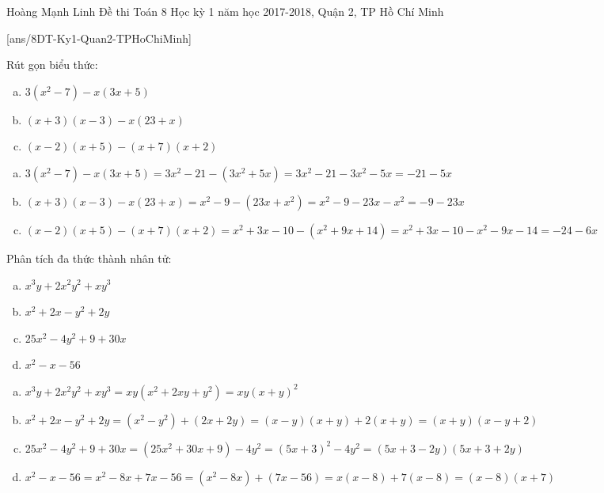 \begin{name}
{Hoàng Mạnh Linh}
{Đề thi Toán 8 Học kỳ 1 năm học 2017-2018, Quận 2, TP Hồ Chí Minh }
\end{name}
\setcounter{ex}{0}
[ans/8DT-Ky1-Quan2-TPHoChiMinh]
\begin{ex}%
Rút gọn biểu thức:
\begin{multicols}{2}
	\begin{enumerate}[a)]
	\item $3(x^2-7)-x(3x+5)$
	\item $(x+3)(x-3)-x(23+x)$
	\item $(x-2)(x+5)-(x+7)(x+2)$
	\end{enumerate}
\end{multicols}
\loigiai
	{
	\begin{enumerate}[a)]
	\item $3(x^2-7)-x(3x+5) = 3x^2 - 21 - (3x^2+5x) = 3x^2 - 21 - 3x^2 - 5x = -21 - 5x$
	\item $(x + 3)(x - 3) - x(23 + x) = x^2 - 9 - (23x + x^2) = x^2 - 9 - 23x - x^2 = -9 - 23x $
	\item $(x - 2)(x + 5) - (x + 7)(x+2) = x^2 + 3x - 10 - (x^2 + 9x + 14) =  x^2 + 3x - 10 - x^2 - 9x - 14 = -24 - 6x$
	\end{enumerate}
	}
\end{ex}

\begin{ex}%
Phân tích đa thức thành nhân tử:
\begin{multicols}{2}
\begin{enumerate}[a)]
\item $x^3y + 2x^2y^2 + xy^3$
\item $x^2 + 2x - y^2 + 2y$
\item $25x^2 - 4y^2 + 9 +30x$
\item $x^2 - x - 56$
\end{enumerate}
\end{multicols}
\loigiai
	{
	\begin{enumerate}[a)]
	\item $x^3y + 2x^2y^2 + xy^3 = xy(x^2 + 2xy + y^2) = xy(x + y)^2$
	\item $x^2 + 2x - y^2 + 2y = (x^2 - y^2) + (2x + 2y) = (x - y)(x + y) + 2(x + y) = (x + y)(x - y + 2)$
	\item $25x^2 - 4y^2 + 9 +30x = (25x^2 + 30x + 9) - 4y^2 = (5x + 3)^2 - 4y^2 = (5x + 3 - 2y)(5x + 3 + 2y)$
	\item $x^2 - x - 56 = x^2 - 8x + 7x - 56 = (x^2 - 8x) + (7x - 56) = x(x - 8) + 7(x - 8) = (x - 8)(x + 7)$
	\end{enumerate}
	}
\end{ex}

